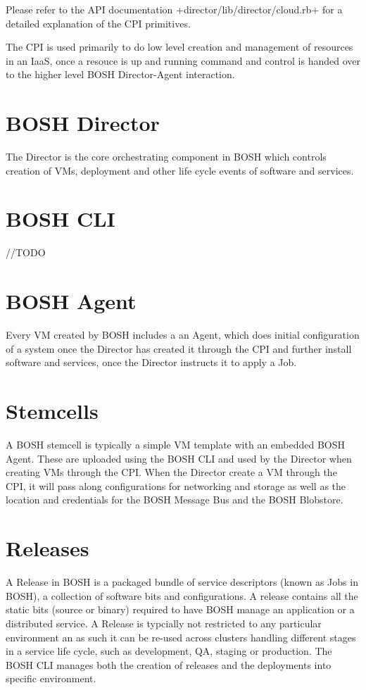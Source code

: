 Please refer to the API documentation +director\slash lib\slash director\slash cloud.rb+
for a detailed explanation of the CPI primitives.

The CPI is used primarily to do low level creation and management of
resources in an IaaS, once a resouce is up and running command and
control is handed over to the higher level BOSH Director-Agent
interaction.

\section{BOSH Director}
\label{boshdirector}

The Director is the core orchestrating component in BOSH which controls
creation of VMs, deployment and other life cycle events of software and
services.

\section{BOSH CLI}
\label{boshcli}

/\slash TODO

\section{BOSH Agent}
\label{boshagent}

Every VM created by BOSH includes a an Agent, which does initial
configuration of a system once the Director has created it through the
CPI and further install software and services, once the Director
instructs it to apply a Job.

\section{Stemcells}
\label{stemcells}

A BOSH stemcell is typically a simple VM template with an embedded BOSH
Agent. These are uploaded using the BOSH CLI and used by the Director
when creating VMs through the CPI. When the Director create a VM through
the CPI, it will pass along configurations for networking and storage as
well as the location and credentials for the BOSH Message Bus and the
BOSH Blobstore.

\section{Releases}
\label{releases}

A Release in BOSH is a packaged bundle of service descriptors (known as
Jobs in BOSH), a collection of software bits and configurations. A
release contains all the static bits (source or binary) required to have
BOSH manage an application or a distributed service. A Release is
typcially not restricted to any particular environment an as such it can
be re-used across clusters handling different stages in a service life
cycle, such as development, QA, staging or production. The BOSH CLI
manages both the creation of releases and the deployments into specific
environment.

